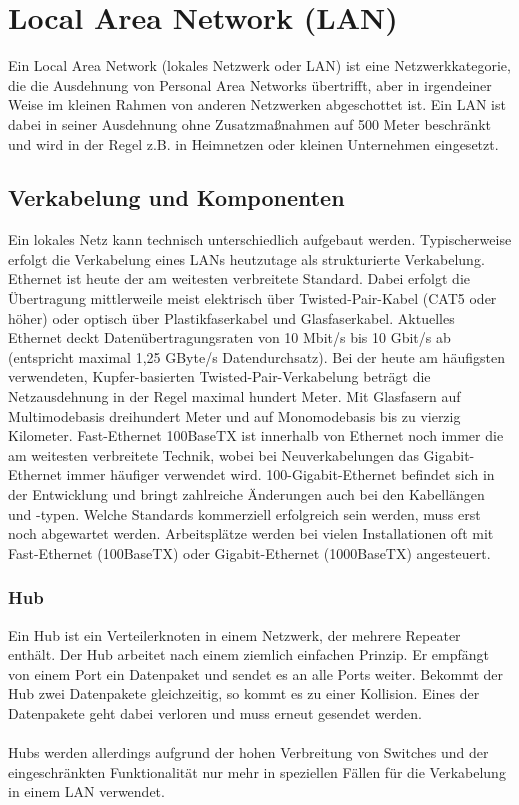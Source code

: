 \documentclass[a4paper,14pt]{scrreprt}
\begin{document}
\chapter{Local Area Network (LAN)}
Ein Local Area Network  (lokales Netzwerk oder LAN) ist eine Netzwerkkategorie, die die Ausdehnung von Personal Area Networks übertrifft, aber in irgendeiner Weise im kleinen Rahmen von anderen Netzwerken abgeschottet ist. Ein LAN ist dabei in seiner Ausdehnung ohne Zusatzmaßnahmen auf 500 Meter beschränkt und wird in der Regel z.B. in Heimnetzen oder kleinen Unternehmen eingesetzt.
\section{Verkabelung und Komponenten}
Ein lokales Netz kann technisch unterschiedlich aufgebaut werden. Typischerweise erfolgt die Verkabelung eines LANs heutzutage als strukturierte Verkabelung. Ethernet ist heute der am weitesten verbreitete Standard. Dabei erfolgt die Übertragung mittlerweile meist elektrisch über Twisted-Pair-Kabel (CAT5 oder höher) oder optisch über Plastikfaserkabel und Glasfaserkabel. Aktuelles Ethernet deckt Datenübertragungsraten von 10 Mbit/s bis 10 Gbit/s ab (entspricht maximal 1,25 GByte/s Datendurchsatz). Bei der heute am häufigsten verwendeten, Kupfer-basierten Twisted-Pair-Verkabelung beträgt die Netzausdehnung in der Regel maximal hundert Meter. Mit Glasfasern auf Multimodebasis dreihundert Meter und auf Monomodebasis bis zu vierzig Kilometer. Fast-Ethernet 100BaseTX ist innerhalb von Ethernet noch immer die am weitesten verbreitete Technik, wobei bei Neuverkabelungen das Gigabit-Ethernet immer häufiger verwendet wird. 100-Gigabit-Ethernet befindet sich in der Entwicklung und bringt zahlreiche Änderungen auch bei den Kabellängen und -typen. Welche Standards kommerziell erfolgreich sein werden, muss erst noch abgewartet werden. Arbeitsplätze werden bei vielen Installationen oft mit Fast-Ethernet (100BaseTX) oder Gigabit-Ethernet (1000BaseTX) angesteuert.
\subsection{Hub}
Ein Hub ist ein Verteilerknoten in einem Netzwerk, der mehrere Repeater enthält. Der Hub arbeitet nach einem ziemlich einfachen Prinzip. Er empfängt von einem Port ein Datenpaket und sendet es an alle Ports weiter. Bekommt der Hub zwei Datenpakete gleichzeitig, so kommt es zu einer Kollision. Eines der Datenpakete geht dabei verloren und muss erneut gesendet werden.\\\\Hubs werden allerdings aufgrund der hohen Verbreitung von Switches und der eingeschränkten Funktionalität nur mehr in speziellen Fällen für die Verkabelung in einem LAN verwendet.
\end{document}
